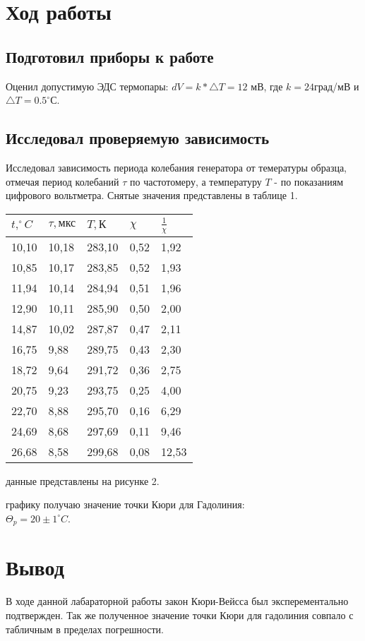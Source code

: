 
\section{Ход работы}

\subsection{Подготовил приборы к работе}

Оценил допустимую ЭДС термопары: $dV = k * \triangle T = 12$ мВ, где $k = 24$град/мВ и $\triangle T = 0.5 ^{\circ}$С.

\subsection{Исследовал проверяемую зависимость}

Исследовал зависимость периода колебания генератора от темературы образца, отмечая период колебаний $\tau$ по частотомеру, а температуру $T$ - по показаниям цифрового вольтметра. Снятые значения представлены в таблице 1.

\begin{table}[h!]
\center
\begin{tabular}{|l|l|l|l|l|}
\hline
$t, ^\circ C$ & $\tau, \text{мкс}$ & $T, \text{К}$ & $\chi$ & $\frac{1}{\chi}$ \\ \hline
10,10 & 10,18 & 283,10 & 0,52 & 1,92 \\ \hline
10,85 & 10,17 & 283,85 & 0,52 & 1,93 \\ \hline
11,94 & 10,14 & 284,94 & 0,51 & 1,96 \\ \hline
12,90 & 10,11 & 285,90 & 0,50 & 2,00 \\ \hline
14,87 & 10,02 & 287,87 & 0,47 & 2,11 \\ \hline
16,75 & 9,88  & 289,75 & 0,43 & 2,30 \\ \hline
18,72 & 9,64  & 291,72 & 0,36 & 2,75 \\ \hline
20,75 & 9,23  & 293,75 & 0,25 & 4,00 \\ \hline
22,70 & 8,88  & 295,70 & 0,16 & 6,29 \\ \hline
24,69 & 8,68  & 297,69 & 0,11 & 9,46 \\ \hline
26,68 & 8,58  & 299,68 & 0,08 & 12,53\\ \hline
\end{tabular}
\end{table}

 данные представлены на рисунке 2.


\newpage

 графику получаю значение точки Кюри для Гадолиния: \\
$\Theta_p = 20\pm1 ^\circ C$.

\section{Вывод}

В ходе данной лабараторной работы закон Кюри-Вейсса был эксперементально подтвержден. Так же полученное значение точки Кюри для гадолиния совпало с табличным в пределах погрешности.
